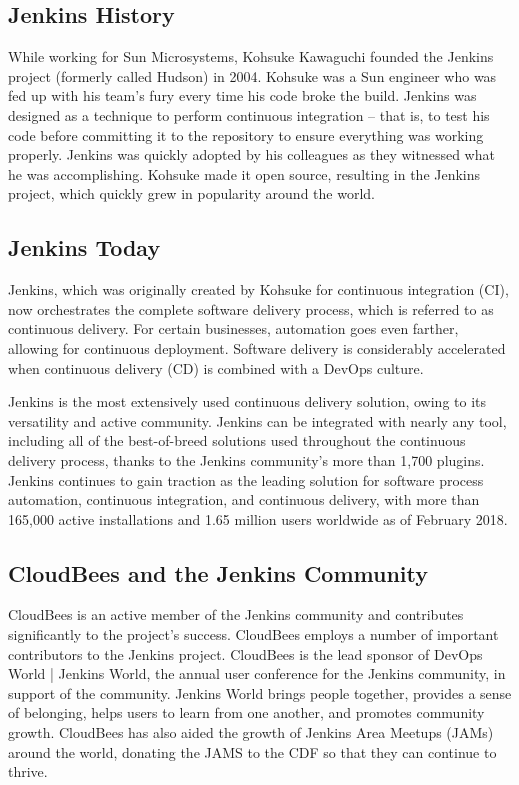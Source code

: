 \subsection*{Jenkins History}
\tab While working for Sun Microsystems, Kohsuke Kawaguchi founded the Jenkins project (formerly called Hudson) in 2004. Kohsuke was a Sun engineer who was fed up with his team's fury every time his code broke the build. Jenkins was designed as a technique to perform continuous integration – that is, to test his code before committing it to the repository to ensure everything was working properly. Jenkins was quickly adopted by his colleagues as they witnessed what he was accomplishing. Kohsuke made it open source, resulting in the Jenkins project, which quickly grew in popularity around the world.

\subsection*{Jenkins Today}
\tab Jenkins, which was originally created by Kohsuke for continuous integration (CI), now orchestrates the complete software delivery process, which is referred to as continuous delivery. For certain businesses, automation goes even farther, allowing for continuous deployment. Software delivery is considerably accelerated when continuous delivery (CD) is combined with a DevOps culture.

\tab Jenkins is the most extensively used continuous delivery solution, owing to its versatility and active community. Jenkins can be integrated with nearly any tool, including all of the best-of-breed solutions used throughout the continuous delivery process, thanks to the Jenkins community's more than 1,700 plugins. Jenkins continues to gain traction as the leading solution for software process automation, continuous integration, and continuous delivery, with more than 165,000 active installations and 1.65 million users worldwide as of February 2018.

\subsection*{CloudBees and the Jenkins Community}
\tab CloudBees is an active member of the Jenkins community and contributes significantly to the project's success. CloudBees employs a number of important contributors to the Jenkins project. CloudBees is the lead sponsor of DevOps World | Jenkins World, the annual user conference for the Jenkins community, in support of the community. Jenkins World brings people together, provides a sense of belonging, helps users to learn from one another, and promotes community growth. CloudBees has also aided the growth of Jenkins Area Meetups (JAMs) around the world, donating the JAMS to the CDF so that they can continue to thrive.

